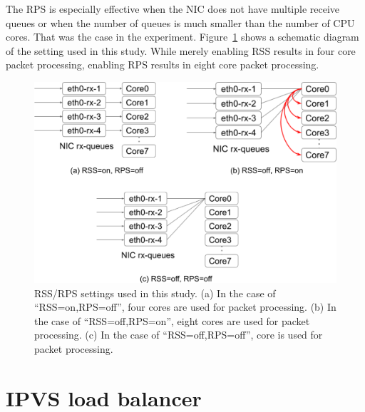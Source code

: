 The RPS is especially effective when the NIC does not have multiple receive queues or when the number of queues is 
much smaller than the number of CPU cores. 
That was the case in the experiment.
Figure~\ref{Figs/rss-rps-none} shows a schematic diagram of the setting used in this study.
While merely enabling RSS results in four core packet processing, enabling RPS results in eight  core packet processing.

\begin{figure}[h]
  \centering
  \includegraphics[width=0.95\columnwidth]{Figs/rss-rps-none}

  \par\bigskip
  \centering
  \begin{minipage}{0.9\columnwidth}
    \caption[RSS/RPS settings]{
      RSS/RPS settings used in this study.
      (a) In the case of \enquote{RSS=on,RPS=off},  four cores are used for packet processing.
      (b) In the case of \enquote{RSS=off,RPS=on}, eight cores are used for packet processing.
      (c) In the case of \enquote{RSS=off,RPS=off},  core is used for packet processing.
    }
    \label{Figs/rss-rps-none}
  \end{minipage}
\end{figure}

\FloatBarrier

\section{IPVS load balancer}

